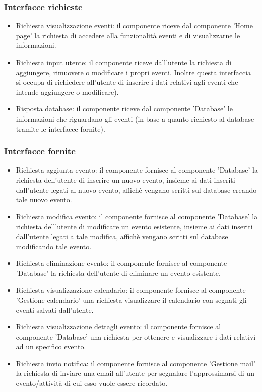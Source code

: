 \documentclass[a4paper,12pt]{article}
\begin{document}
\subsubsection*{Interfacce richieste}
\begin{itemize} \setlength\itemsep{0.01em}
\item {\sffamily Richiesta visualizzazione eventi}: il componente riceve dal componente 'Home page'  la richiesta di accedere alla funzionalità eventi e di visualizzarne le informazioni.
\item {\sffamily Richiesta input utente}: il componente riceve dall'utente la richiesta di aggiungere, rimuovere o modificare i propri eventi. Inoltre questa interfaccia si occupa di richiedere all'utente di inserire i dati relativi agli eventi che intende aggiungere o modificare).
\item {\sffamily Risposta database}: il componente riceve dal componente 'Database' le informazioni che riguardano gli eventi (in base a quanto richiesto al database tramite le interfacce fornite).

\end{itemize}

\subsubsection*{Interfacce fornite}
\begin{itemize} \setlength\itemsep{0.01em}
\item {\sffamily Richiesta aggiunta evento}: il componente fornisce al componente 'Database' la richiesta dell'utente di inserire un nuovo evento, insieme ai dati inseriti dall'utente legati al nuovo evento, affichè vengano scritti sul database creando tale nuovo evento.
\item {\sffamily Richiesta modifica evento}: il componente fornisce al componente 'Database'  la richiesta dell'utente di modificare un evento esistente, insieme ai dati inseriti dall'utente legati a tale modifica, affichè vengano scritti sul database modificando tale evento.
\item {\sffamily Richiesta eliminazione evento}: il componente fornisce al componente 'Database'  la richiesta dell'utente di eliminare un evento esistente.
\item {\sffamily Richiesta visualizzazione calendario}: il componente fornisce al componente 'Gestione calendario' una richiesta visualizzare il calendario con segnati gli eventi salvati dall'utente.
\item {\sffamily Richiesta visualizzazione dettagli evento}: il componente fornisce al componente 'Database' una richiesta per ottenere e visualizzare i dati relativi ad un specifico evento.
\item {\sffamily Richiesta invio notifica}: il componente fornisce al componente 'Gestione mail' la richiesta di inviare una email all'utente per segnalare l'approssimarsi di un evento/attività di cui esso vuole essere ricordato.
\end{itemize}
\end{document}
